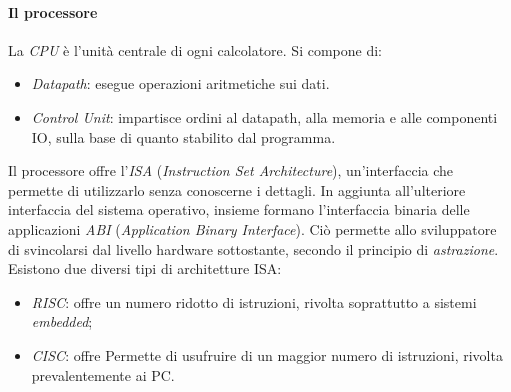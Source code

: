 \documentclass[class=book, crop=false]{standalone}
\begin{document}
\paragraph*{Il processore}
La \emph{CPU} è l'unità centrale di ogni calcolatore. Si compone di:
\begin{itemize}[noitemsep]
	\item \emph{Datapath}: esegue operazioni aritmetiche sui dati.
	\item \emph{Control Unit}: impartisce ordini al datapath, alla memoria e alle componenti IO, sulla base di quanto stabilito dal programma.
\end{itemize}
Il processore offre l'\emph{ISA} (\emph{Instruction Set Architecture}), un'interfaccia che permette di utilizzarlo senza conoscerne i dettagli. In aggiunta all'ulteriore interfaccia del sistema operativo, insieme formano l'interfaccia binaria delle applicazioni \emph{ABI} (\emph{Application Binary Interface}). Ciò permette allo sviluppatore di svincolarsi dal livello hardware sottostante, secondo il principio di \emph{astrazione}.\\ Esistono due diversi tipi di architetture ISA:
\begin{itemize}[noitemsep,nolistsep]
	\item \emph{RISC}: offre un numero ridotto di istruzioni, rivolta soprattutto a sistemi \emph{embedded};
	\item \emph{CISC}: offre Permette di usufruire di un maggior numero di istruzioni, rivolta prevalentemente ai PC.
\end{itemize}
\end{document}
